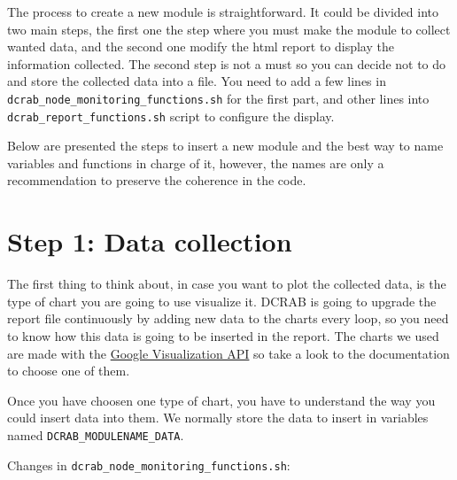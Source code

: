 \documentclass[10pt,a4paper]{report}
\begin{document}
The process to create a new module is straightforward. It could be divided into two main steps, the first one the step where you must make the module to collect wanted data, and the second one modify the html report to display the information collected. The second step is not a must so you can decide not to do and store the collected data into a file. You need to add a few lines in \texttt{dcrab\_node\_monitoring\_functions.sh} for the first part, and other lines into \texttt{dcrab\_report\_functions.sh} script to configure the display.

Below are presented the steps to insert a new module and the best way to name variables and functions in charge of it, however, the names are only a recommendation to preserve the coherence in the code.

\section{Step 1: Data collection}

The first thing to think about, in case you want to plot the collected data, is the type of chart you are going to use visualize it. DCRAB is going to upgrade the report file continuously by adding new data to the charts every loop, so you need to know how this data is going to be inserted in the report. The charts we used are made with the \href{https://developers.google.com/chart/interactive/docs/reference}{Google Visualization API} so take a look to the documentation to choose one of them.

Once you have choosen one type of chart, you have to understand the way you could insert data into them. We normally store the data to insert in variables named \verb+DCRAB_MODULENAME_DATA+.

Changes in \texttt{dcrab\_node\_monitoring\_functions.sh}:
\end{document}
